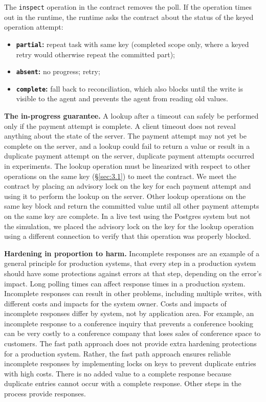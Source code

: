\documentclass[letterpaper,twocolumn,10pt]{article}
\begin{document}
The \texttt{inspect} operation in the contract removes the poll. If the operation times out in the runtime, the runtime asks the contract about the status of the keyed operation attempt:

\begin{itemize}
\item \textbf{\texttt{partial}:} repeat task with same key (completed scope only, where a keyed retry would otherwise repeat the committed part);
\item \textbf{\texttt{absent}:} no progress; retry;
\item \textbf{\texttt{complete}:} fall back to reconciliation, which also blocks until the write is visible to the agent and prevents the agent from reading old values.
\end{itemize}

\textbf{The in-progress guarantee.} A lookup after a timeout can safely be performed only if the payment attempt is complete. A client timeout does not reveal anything about the state of the server. The payment attempt may not yet be complete on the server, and a lookup could fail to return a value or result in a duplicate payment attempt on the server, duplicate payment attempts occurred in experiments. The lookup operation must be linearized with respect to other operations on the same key (\S\ref{sec:3.1}) to meet the contract. We meet the contract by placing an advisory lock on the key for each payment attempt and using it to perform the lookup on the server. Other lookup operations on the same key block and return the committed value until all other payment attempts on the same key are complete. In a live test using the Postgres system but not the simulation, we placed the advisory lock on the key for the lookup operation using a different connection to verify that this operation was properly blocked.

\textbf{Hardening in proportion to harm.} Incomplete responses are an example of a general principle for production systems, that every step in a production system should have some protections against errors at that step, depending on the error's impact. Long polling times can affect response times in a production system. Incomplete responses can result in other problems, including multiple writes, with different costs and impacts for the system owner. Costs and impacts of incomplete responses differ by system, not by application area. For example, an incomplete response to a conference inquiry that prevents a conference booking can be very costly to a conference company that loses sales of conference space to customers. The fast path approach does not provide extra hardening protections for a production system. Rather, the fast path approach ensures reliable incomplete responses by implementing locks on keys to prevent duplicate entries with high costs. There is no added value to a complete response because duplicate entries cannot occur with a complete response. Other steps in the process provide responses.
\end{document}
